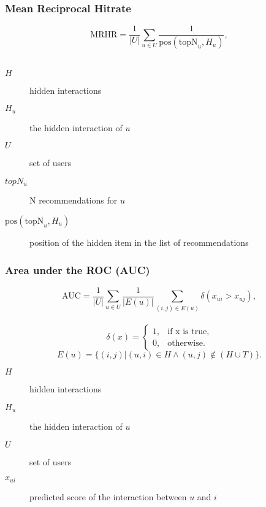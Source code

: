 \documentclass{beamer}
\begin{document}
\begin{frame} 
    \frametitle{Mean Reciprocal Hitrate~\cite{DBLP:conf/icdm/NingK11}}
\begin{equation} 
\text{MRHR}=\frac{1}{|U|} \sum_{u \in U} \frac{1}{\text{pos}(\text{topN}_{u},H_{u})},
\end{equation}\\
\vspace{6.4mm}
\begin{description}
    \item[$H$] hidden interactions\\
    \item[$H_u$] the hidden interaction of $u$\\
    \item[$U$] set of users
    \item[$topN_u$] N recommendations for $u$
    \item[$\text{pos}(\text{topN}_{u},H_{u})$] position of the hidden item in the list of recommendations
\end{description}
\end{frame}

\begin{frame} 
    \frametitle{Area under the ROC (AUC)~\cite{Rendle:2009:BBP:1795114.1795167}}
\begin{equation} 
\text{AUC}=\frac{1}{|U|}\sum_{u \in U} \frac{1}{|E(u)|} 
\sum_{(i,j) \in E(u)} \delta(x_{ui}>x_{uj}),
\end{equation}\\
\begin{equation}
\delta(x)=\begin{cases}1, & \text{if x is true}, \\
                       0, & \text{otherwise.}
\end{cases}
\end{equation}
\begin{equation}
E(u) =\{(i,j)|(u,i) \in H \land (u,j) \not\in (H \cup T)\}.
\end{equation}
\begin{description}
    \item[$H$] hidden interactions\\
    \item[$H_u$] the hidden interaction of $u$\\
    \item[$U$] set of users
    \item[$x_{ui}$] predicted score of the interaction between $u$ and $i$
\end{description}
\end{frame}
\end{document}
